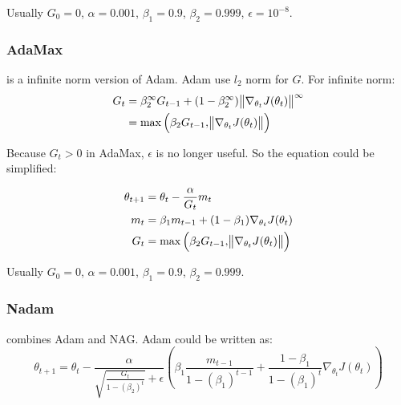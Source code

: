 Usually $G_0 = 0$, $\alpha = 0.001$, $\beta_1 = 0.9$, $\beta_2 = 0.999$, $\epsilon = 10^{-8}$.





\subsubsection{AdaMax}
\cite{Kingma2015} is a infinite norm version of Adam. Adam use $l_2$ norm for $G$. For infinite norm:
\begin{equation}
    \begin{aligned}
        G_t &= \beta_2^\infty G_{t-1} + (1-\beta_2^\infty ) \norm{\nabla_{\theta_t} J(\theta_t)}^\infty  \\
        &= \max \left(\beta_2 G_{t-1}, \norm{\nabla_{\theta_t} J(\theta_t)} \right)
    \end{aligned}
\end{equation}

Because $G_t > 0$ in AdaMax, $\epsilon$ is no longer useful. So the equation could be simplified:

\begin{equation}
    \begin{aligned}
        \theta_{t+1} &= \theta_t - \frac{\alpha}{G_t}  m_t \\
        m_t &= \beta_1 m_{t-1} + (1-\beta_1) \nabla_{\theta_t} J(\theta_t) \\
        G_t &= \max \left(\beta_2 G_{t-1}, \norm{\nabla_{\theta_t} J(\theta_t)} \right)
    \end{aligned}
\end{equation}

Usually $G_0 = 0$, $\alpha = 0.001$, $\beta_1 = 0.9$, $\beta_2 = 0.999$.


\subsubsection{Nadam}

\cite{Dozat2016} combines Adam and NAG. Adam could be written as:
\begin{equation}
    \theta_{t+1} = \theta_t - \frac{\alpha}{\sqrt{\displaystyle \frac{G_t}{1-(\beta_2)^t}} + \epsilon} \left(\beta_1 \frac{m_{t-1}}{1-(\beta_1)^{t-1}} + \frac{1-\beta_1}{1-(\beta_1)^t} \nabla_{\theta_t} J(\theta_t) \right)
\end{equation}

